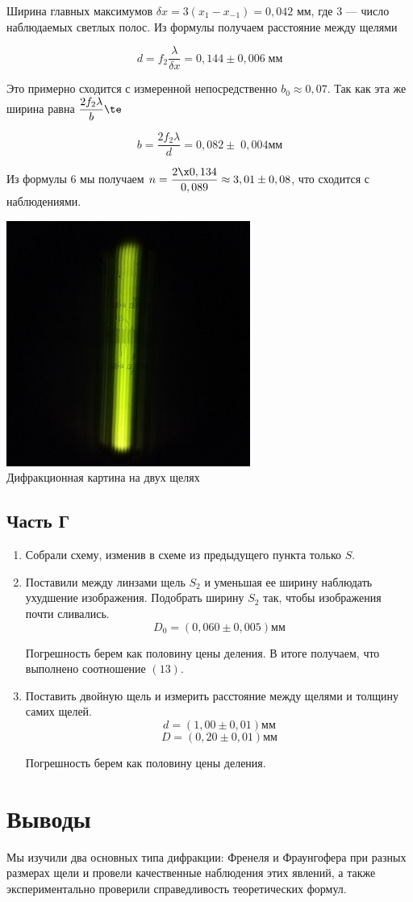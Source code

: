  Ширина главных максимумов $  \delta x  = 3 (x_{1} - x_{-1} )= 0,042 $ мм, где 3 --- число наблюдаемых светлых полос. Из формулы \5 получаем расстояние между щелями 
 
 \begin{equation}\label{}
 d = f_2 \dfrac{\lambda}{\delta x} = 0,144 \pm 0,006 \; мм
 \end{equation}
 
Это примерно сходится с измеренной непосредственно $ b_0 \approx 0,07 $. Так как эта же ширина равна $ \dfrac{2f_2 \lambda}{b} \te $
 
 \begin{equation}\label{}
 b = \dfrac{2 f_2 \lambda}{d} = 0,082 \pm \;0,004 мм
 \end{equation}
 
 Из формулы 6 мы получаем $ n = \dfrac{2 \x 0,134}{0,089} \approx 3,01 \pm 0,08 $, что сходится с наблюдениями. 
 
  \begin{center}
    \includegraphics[width = 0.6\textwidth]{8.png}\\
    
    Дифракционная картина на двух щелях
  \end{center}
 
 \newpage
\subsection*{Часть Г}
\begin{enumerate}
\item Собрали схему, изменив в схеме из предыдущего пункта только $S$.
\item Поставили между линзами щель $S_2$ и уменьшая ее ширину наблюдать ухудшение изображения. Подобрать ширину $S_2$ так, чтобы изображения почти сливались.
\[D_0 = (0,060 \pm 0,005)\text{мм}\]


Погрешность берем как половину цены деления.
В итоге получаем, что выполнено соотношение $(13)$.
\item Поставить двойную щель и измерить расстояние между щелями и толщину самих щелей. 
\[d = (1,00 \pm 0,01) \text{мм}\]
\[D = (0,20 \pm 0,01) \text{мм}\]

Погрешность берем как половину цены деления.
\end{enumerate}

\section{Выводы}

Мы изучили два основных типа дифракции: Френеля и Фраунгофера при разных размерах щели и провели качественные наблюдения этих явлений, а также экспериментально проверили справедливость теоретических формул.



